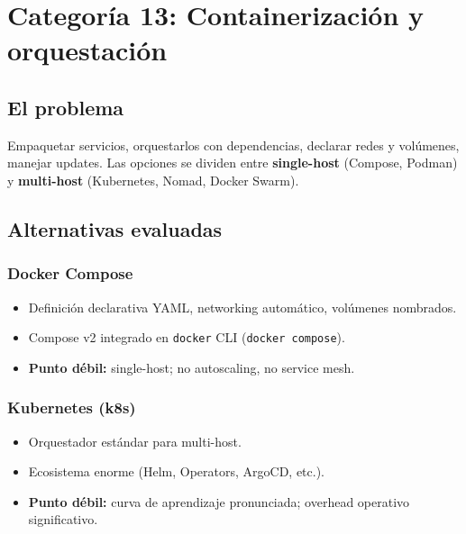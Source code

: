 \documentclass[11pt,a4paper]{article}
\begin{document}
\newpage

\section{Categoría 13: Containerización y orquestación}

\subsection{El problema}

Empaquetar servicios, orquestarlos con dependencias, declarar redes y volúmenes, manejar updates. Las opciones se dividen entre \textbf{single-host} (Compose, Podman) y \textbf{multi-host} (Kubernetes, Nomad, Docker Swarm).

\subsection{Alternativas evaluadas}

\subsubsection{Docker Compose}
\begin{itemize}[leftmargin=*,itemsep=0pt]
\item Definición declarativa YAML, networking automático, volúmenes nombrados.
\item Compose v2 integrado en \texttt{docker} CLI (\texttt{docker compose}).
\item \textbf{Punto débil:} single-host; no autoscaling, no service mesh.
\end{itemize}

\subsubsection{Kubernetes (k8s)}
\begin{itemize}[leftmargin=*,itemsep=0pt]
\item Orquestador estándar para multi-host.
\item Ecosistema enorme (Helm, Operators, ArgoCD, etc.).
\item \textbf{Punto débil:} curva de aprendizaje pronunciada; overhead operativo significativo.
\end{itemize}
\end{document}
